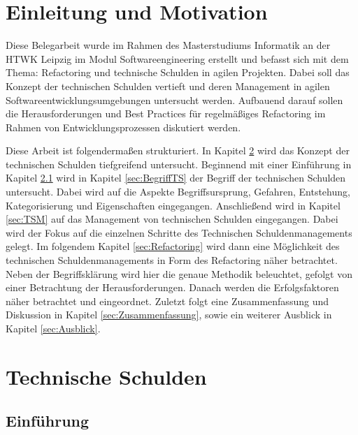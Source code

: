 \documentclass[acmtog]{acmart}
\begin{document}
\maketitle

\section{Einleitung und Motivation}

Diese Belegarbeit wurde im Rahmen des Masterstudiums Informatik an der HTWK Leipzig
im Modul Softwareengineering erstellt und befasst sich mit dem Thema: Refactoring und
technische Schulden in agilen Projekten. Dabei soll das Konzept der technischen Schulden
vertieft und deren Management in agilen Softwareentwicklungsumgebungen untersucht werden.
Aufbauend darauf sollen die Herausforderungen und Best Practices für regelmäßiges
Refactoring im Rahmen von Entwicklungsprozessen diskutiert werden.

Diese Arbeit ist folgendermaßen strukturiert.
In Kapitel \ref{sec:TS} wird das Konzept der technischen Schulden tiefgreifend untersucht.
Beginnend mit einer Einführung in Kapitel \ref{sec:EinführungTS} wird in Kapitel \ref{sec:BegriffTS}
der Begriff der technischen Schulden untersucht. Dabei wird auf die Aspekte Begriffsursprung, Gefahren, Entstehung, Kategorisierung und Eigenschaften eingegangen.
Anschließend wird in Kapitel \ref{sec:TSM} auf das Management von technischen Schulden eingegangen.
Dabei wird der Fokus auf die einzelnen Schritte des Technischen Schuldenmanagements gelegt.
Im folgendem Kapitel \ref{sec:Refactoring} wird dann eine Möglichkeit des technischen Schuldenmanagements in Form des Refactoring näher betrachtet.
Neben der Begriffsklärung wird hier die genaue Methodik beleuchtet, gefolgt von einer Betrachtung der Herausforderungen.
Danach werden die Erfolgsfaktoren näher betrachtet und eingeordnet.
Zuletzt folgt eine Zusammenfassung und Diskussion in Kapitel \ref{sec:Zusammenfassung}, sowie ein weiterer Ausblick in Kapitel \ref{sec:Ausblick}.

\section{Technische Schulden}\label{sec:TS}

\subsection{Einführung}\label{sec:EinführungTS}
\end{document}
